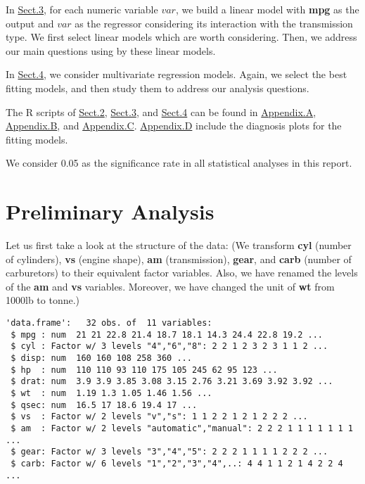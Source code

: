 \documentclass[]{article}
\begin{document}
In \protect\hyperlink{sec-single}{Sect.3}, for each numeric variable
\(var\), we build a linear model with \textbf{mpg} as the output and
\(var\) as the regressor considering its interaction with the
transmission type. We first select linear models which are worth
considering. Then, we address our main questions using by these linear
models.

In \protect\hyperlink{sec-mult}{Sect.4}, we consider multivariate
regression models. Again, we select the best fitting models, and then
study them to address our analysis questions.

The R scripts of \protect\hyperlink{sec-prelim}{Sect.2},
\protect\hyperlink{sec-single}{Sect.3}, and
\protect\hyperlink{sec-mult}{Sect.4} can be found in
\protect\hyperlink{app-code-2}{Appendix.A},
\protect\hyperlink{app-code-3}{Appendix.B}, and
\protect\hyperlink{app-code-4}{Appendix.C}.
\protect\hyperlink{app-diag}{Appendix.D} include the diagnosis plots for
the fitting models.

We consider 0.05 as the significance rate in all statistical analyses in
this report.

\hypertarget{sec-prelim}{\section{Preliminary
Analysis}\label{sec-prelim}}

Let us first take a look at the structure of the data: (We transform
\textbf{cyl} (number of cylinders), \textbf{vs} (engine shape),
\textbf{am} (transmission), \textbf{gear}, and \textbf{carb} (number of
carburetors) to their equivalent factor variables. Also, we have renamed
the levels of the \textbf{am} and \textbf{vs} variables. Moreover, we
have changed the unit of \textbf{wt} from 1000lb to tonne.)

\begin{verbatim}
'data.frame':   32 obs. of  11 variables:
 $ mpg : num  21 21 22.8 21.4 18.7 18.1 14.3 24.4 22.8 19.2 ...
 $ cyl : Factor w/ 3 levels "4","6","8": 2 2 1 2 3 2 3 1 1 2 ...
 $ disp: num  160 160 108 258 360 ...
 $ hp  : num  110 110 93 110 175 105 245 62 95 123 ...
 $ drat: num  3.9 3.9 3.85 3.08 3.15 2.76 3.21 3.69 3.92 3.92 ...
 $ wt  : num  1.19 1.3 1.05 1.46 1.56 ...
 $ qsec: num  16.5 17 18.6 19.4 17 ...
 $ vs  : Factor w/ 2 levels "v","s": 1 1 2 2 1 2 1 2 2 2 ...
 $ am  : Factor w/ 2 levels "automatic","manual": 2 2 2 1 1 1 1 1 1 1 ...
 $ gear: Factor w/ 3 levels "3","4","5": 2 2 2 1 1 1 1 2 2 2 ...
 $ carb: Factor w/ 6 levels "1","2","3","4",..: 4 4 1 1 2 1 4 2 2 4 ...
\end{verbatim}
\end{document}
